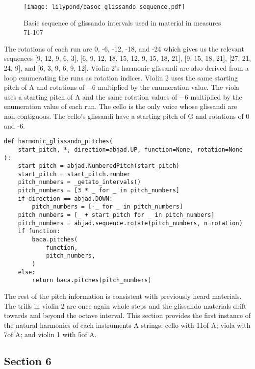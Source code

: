 \setcounter{figure}{29}
\begin{figure}[H]
    \texttt{[image: lilypond/basoc\_glissando\_sequence.pdf]}
    \caption{Basic sequence of glissando intervals used in material  in measures 71-107}
    \label{fig:gliss-intervals-1}
\end{figure}

The rotations of each run are 0, -6, -12, -18, and -24 which gives us the relevant sequences [9, 12, 9, 6, 3], [6, 9, 12, 18, 15, 12, 9, 15, 18, 21], [9, 15, 18, 21], [27, 21, 24, 9], and [6, 3, 9, 6, 9, 12]. Violin 2's harmonic glissandi are also derived from a loop enumerating the runs as rotation indices. Violin 2 uses the same starting pitch of A and rotations of $-6$ multiplied by the enumeration value. The viola uses a starting pitch of A and the same rotation values of $-6$ multiplied by the enumeration value of each run. The cello is the only voice whose glissandi are non-contiguous. The cello's glissandi have a starting pitch of G and rotations of 0 and -6.

\begin{lstlisting}[frame=tb,caption={Harmonic glissando pitch generator},label=lst:harmonic-pitches]
def harmonic_glissando_pitches(
    start_pitch, *, direction=abjad.UP, function=None, rotation=None
):
    start_pitch = abjad.NumberedPitch(start_pitch)
    start_pitch = start_pitch.number
    pitch_numbers = _getato_intervals()
    pitch_numbers = [3 * _ for _ in pitch_numbers]
    if direction == abjad.DOWN:
        pitch_numbers = [-_ for _ in pitch_numbers]
    pitch_numbers = [_ + start_pitch for _ in pitch_numbers]
    pitch_numbers = abjad.sequence.rotate(pitch_numbers, n=rotation)
    if function:
        baca.pitches(
            function,
            pitch_numbers,
        )
    else:
        return baca.pitches(pitch_numbers)
\end{lstlisting}

The rest of the pitch information is consistent with previously heard materials. The  trills in violin 2 are once again whole steps and the glissando  materials drift towards and beyond the octave interval. This section provides the first instance of the  natural harmonics of each instruments A strings: cello with 11\textdegree of A; viola with 7\textdegree of A; and violin 1 with 5\textdegree of A.

\subsection{Section 6}

